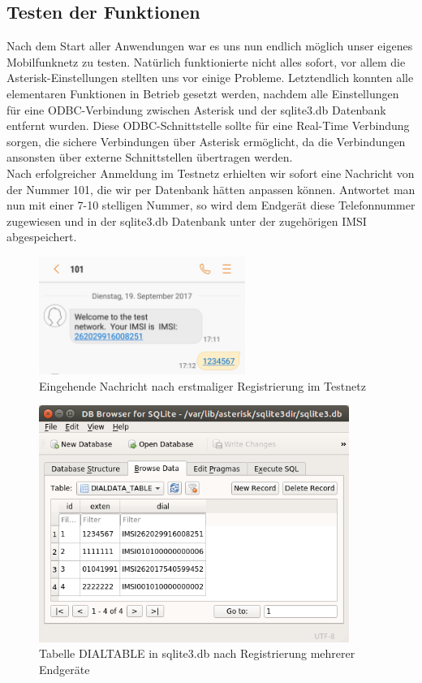 \subsection{Testen der Funktionen}
Nach dem Start aller Anwendungen war es uns nun endlich möglich unser eigenes Mobilfunknetz zu testen. Natürlich funktionierte nicht alles sofort, vor allem die Asterisk-Einstellungen stellten uns vor einige Probleme. Letztendlich konnten alle elementaren Funktionen in Betrieb gesetzt werden, nachdem alle Einstellungen für eine ODBC-Verbindung zwischen Asterisk und der sqlite3.db Datenbank entfernt wurden. Diese ODBC-Schnittstelle sollte für eine Real-Time Verbindung sorgen, die sichere Verbindungen über Asterisk ermöglicht, da die Verbindungen ansonsten über externe Schnittstellen übertragen werden.\\
Nach erfolgreicher Anmeldung im Testnetz erhielten wir sofort eine Nachricht von der Nummer 101, die wir per Datenbank hätten anpassen können. Antwortet man nun mit einer 7-10 stelligen Nummer, so wird dem Endgerät diese Telefonnummer zugewiesen und in der sqlite3.db Datenbank unter der zugehörigen IMSI abgespeichert.

\begin{figure}[htbp]
	\centering
		\includegraphics[width=0.6\textwidth]{includes/openbts_registration}
	\caption{Eingehende Nachricht nach erstmaliger Registrierung im Testnetz}
	\label{fig:openbts_registration}
\end{figure}

\begin{figure}[htbp]
	\centering
		\includegraphics[width=0.9\textwidth]{includes/DB_asterisk_dialtable}
	\caption{Tabelle DIALTABLE in sqlite3.db nach Registrierung mehrerer Endgeräte}
	\label{fig:asterisk_dialtable}
\end{figure}

